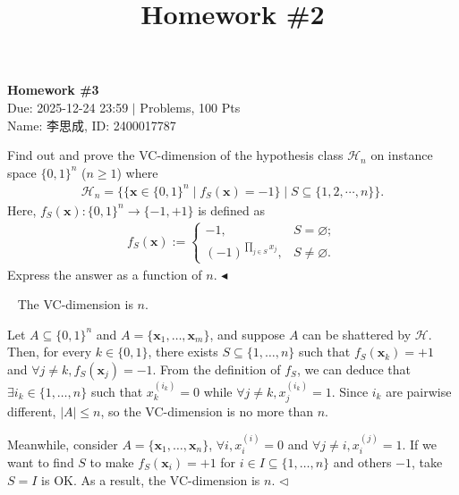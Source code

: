 \documentclass[11pt]{article}
\title{Homework \#2}
\newenvironment{problem}[2][Problem]{\begin{trivlist}
\item[\hskip \labelsep {\bfseries #1}\hskip \labelsep {\bfseries #2.}]}{\hfill$\blacktriangleleft$\end{trivlist}}
\newenvironment{answer}[1][Answer]{\begin{trivlist}
\item[\hskip \labelsep {\bfseries #1.}\hskip \labelsep]}{\hfill$\lhd$\end{trivlist}}
\begin{document}
\pagestyle{fancy}
\chead{}

\begin{center}
    {\LARGE \bf Homework \#3}\\
    {Due: 2025-12-24 23:59 \quad$|$ Problems, 100 Pts}\\
    {Name: 李思成, ID: 2400017787}            %
\end{center}

\begin{problem}{1 (15')}
Find out and prove the VC-dimension of the hypothesis class $\mathcal{H}_n$ on instance space $\{0,1\}^n$ ($n\geq 1$) where
\begin{align*}
    \mathcal{H}_n=\{\{\bm x\in \{0,1\}^n \mid f_S(\bm x)=-1\}\mid S\subseteq \{1,2,\cdots,n\}\}.
\end{align*}
Here, $f_S(\bm x): \{0,1\}^n\to\{-1,+1\}$ is defined as
\begin{align*}
    f_S(\bm x) := \begin{cases}
        -1,  & S = \varnothing; \\ 
        (-1)^{\prod_{j\in S}x_j}, &  S \ne \varnothing.
    \end{cases}
\end{align*}
Express the answer as a function of $n$.
\end{problem}

\begin{answer} ~
    The VC-dimension is $n$.

    Let $A \subseteq \{0, 1\}^n$ and $A = \{\bm x_1, \dots, \bm x_m\}$, and suppose $A$ can be shattered by $\mathcal{H}$. Then, for every $k \in \{0, 1\}$, there exists $S \subseteq \{1, \dots, n\}$ such that $f_S(\bm x_k) = +1$ and $\forall j \neq k, f_S(\bm x_j) = -1$. From the definition of $f_S$, we can deduce that $\exists i_k \in \{1,\dots,n\}$ such that $x_k^{(i_k)} = 0$ while $\forall j \neq k, x_j^{(i_k)} = 1$. Since $i_k$ are pairwise different, $|A| \le n$, so the VC-dimension is no more than $n$.

    Meanwhile, consider $A = \{\bm x_1, \dots, \bm x_n\}$, $\forall i, x_i^{(i)} = 0$ and $\forall j \neq i, x_i^{(j)} = 1$. If we want to find $S$ to make $f_S(\bm x_i) = +1$ for $i \in I \subseteq \{1, \dots, n\}$ and others $-1$, take $S = I$ is OK. As a result, the VC-dimension is $n$.
\end{answer}
\end{document}

